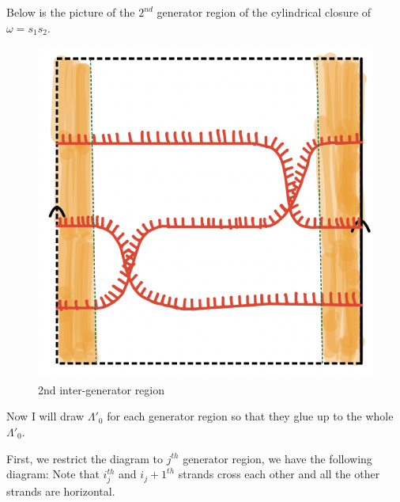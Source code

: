 Below is the picture of the $2^{nd}$ generator region of the cylindrical closure of $\omega = s_1 s_2$.

\begin{figure}[H]
    \centering
    \includegraphics[scale = 0.95]{diagrams/natural_alternating_diagrams/7-2.png}
    \caption{2nd inter-generator region}
    \label{fig:your-label}
\end{figure}

Now I will draw $\Lambda'_0$ for each generator region so that they glue up to the whole $\Lambda'_0$. 

First, we restrict the diagram to $j^{th}$ generator region, we have the following diagram: Note that $i_j^{th}$ and $i_{j}+1^{th}$ strands cross each other and all the other strands are horizontal.

